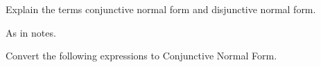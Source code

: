 
\printanswers


\begin{questions}


\question
Explain the terms conjunctive normal form and disjunctive normal form.
\begin{solution}
As in notes.
\end{solution}


\question
Convert the following expressions to Conjunctive Normal Form.
\begin{solution}
\end{solution}
\end{questions}
